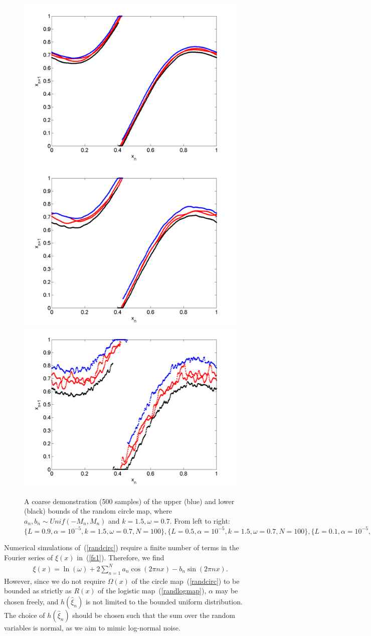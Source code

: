 \begin{figure}[htp]
\caption[Upper and lower bounds on the random circle map, with a uniform
distribution, where $k=1.5,\omega=0.7$]{A coarse
  demonstration (500 samples) of the upper (blue) and lower (black)
  bounds of the random circle map, where $a_n,b_n\sim Unif(-M_n,M_n)$
  and $k=1.5,\omega=0.7$. From left to right:
  $\{L=0.9,\alpha = 10^{-5},k=1.5,\omega=0.7,N=100\}, \{L=0.5,\alpha = 10^{-5},k=1.5,\omega=0.7,N=100\},\{L=0.1,\alpha = 10^{-5},k=1.5,\omega=0.7,N=100\},$
  }\label{fig:circ_u_envelope3}
\centering
\includegraphics[width=.3\textwidth]{figs/envelope_unif_500_k15_L09_w07.png}\hfill
\includegraphics[width=.3\textwidth]{figs/envelope_unif_500_k15_L05_w07.png}\hfill
\includegraphics[width=.3\textwidth]{figs/envelope_unif_500_k15_L01_w07.png}
\end{figure}

Numerical simulations of~(\ref{randcirc}) require a finite number of
terms in the Fourier series of $\xi(x)$ in~(\ref{fs1}). Therefore, we find
\begin{align}\label{fs_circ}
\xi(x) = \ln(\omega) + 2\sum^N_{n=1}a_n\cos(2\pi nx)-b_n\sin(2\pi nx).
\end{align}
However, since we
do not require $\Omega(x)$ of the circle map~(\ref{randcirc}) to be bounded as strictly
as $R(x)$ of the logistic map~(\ref{randlogmap}), $\alpha$ may be
chosen freely, and $h(\hat{\xi}_n)$ is not limited to the bounded uniform
distribution. The choice of $h(\hat{\xi}_n)$ should be chosen such that the
sum over the random variables is normal, as we aim to mimic log-normal
noise.

